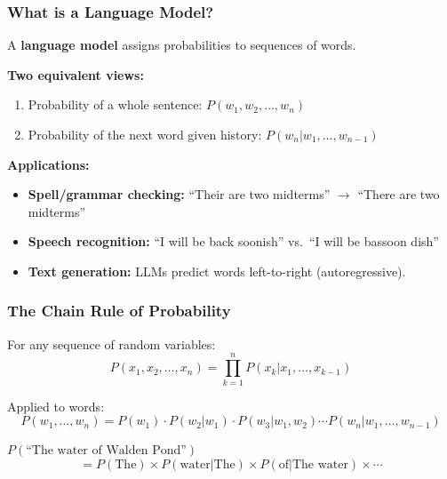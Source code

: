 \bigseparator

\subsubsection{What is a Language Model?}

\begin{defbox}
A \textbf{language model} assigns probabilities to sequences of words.

\textbf{Two equivalent views:}
\begin{enumerate}
  \item Probability of a whole sentence: $P(w_1, w_2, \ldots, w_n)$
  \item Probability of the next word given history: $P(w_n | w_1, \ldots, w_{n-1})$
\end{enumerate}
\end{defbox}

\textbf{Applications:}
\begin{itemize}
  \item \textbf{Spell/grammar checking:} ``Their are two midterms'' $\to$ ``There are two midterms''
  \item \textbf{Speech recognition:} ``I will be back soonish'' vs.\ ``I will be bassoon dish''
  \item \textbf{Text generation:} LLMs predict words left-to-right (autoregressive).
\end{itemize}

\separator

\subsubsection{The Chain Rule of Probability}

\begin{defbox}
For any sequence of random variables:
\[
P(x_1, x_2, \ldots, x_n) = \prod_{k=1}^{n} P(x_k | x_1, \ldots, x_{k-1})
\]

Applied to words:
\[
P(w_1, \ldots, w_n) = P(w_1) \cdot P(w_2|w_1) \cdot P(w_3|w_1, w_2) \cdots P(w_n|w_1, \ldots, w_{n-1})
\]
\end{defbox}

\begin{exbox}
$P(\text{``The water of Walden Pond''})$
\[
= P(\text{The}) \times P(\text{water}|\text{The}) \times P(\text{of}|\text{The water}) \times \cdots
\]
\end{exbox}

